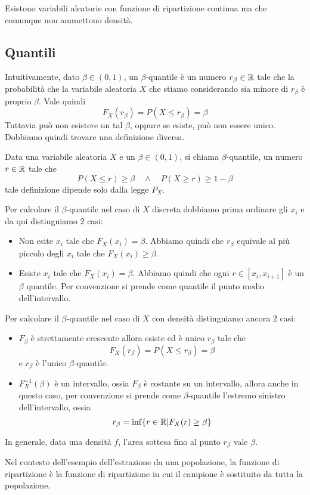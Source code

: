 \begin{observation}
	Esistono variabili aleatorie con funzione di ripartizione continua ma che comunque non
	ammettono densità.
\end{observation}

\subsection{Quantili}
Intuitivamente, dato $\beta \in (0,1)$, un $\beta$-quantile è un numero $r_\beta \in \mathbb{R}$ tale che
la probabilità che la variabile aleatoria $X$ che stiamo considerando sia minore di $r_\beta$ è
proprio $\beta$. Vale quindi
\[ F_X (r_\beta) = P(X \leq r_\beta) = \beta \]
Tuttavia può non esistere un tal $\beta$, oppure se esiste, può non essere unico. Dobbiamo quindi
trovare una definizione diversa.

\begin{definition}
	Data una variabile aleatoria $X$ e un $\beta \in (0,1)$, si chiama $\beta$-quantile, un numero
	$r \in \mathbb{R}$ tale che
	\[ P(X \leq r) \geq \beta \quad \land \quad P(X \geq r) \geq 1 - \beta \]
	tale definizione dipende solo dalla legge $P_X$.
\end{definition}

Per calcolare il $\beta$-quantile nel caso di $X$ discreta dobbiamo prima ordinare gli $x_i$ e da
qui distinguiamo 2 casi:
\begin{itemize}
	\item Non esite $x_i$ tale che $F_X(x_i) = \beta$. Abbiamo quindi che $r_\beta$ equivale al più
	      piccolo degli $x_i$ tale che $F_X(x_i) \geq \beta$.
	\item Esiste $x_i$ tale che $F_X(x_i) = \beta$. Abbiamo quindi che ogni $r \in [x_i, x_{i+1}]$
	      è un $\beta$ quantile. Per convenzione si prende come quantile il punto medio
	      dell'intervallo.
\end{itemize}
Per calcolare il $\beta$-quantile nel caso di $X$ con densità distinguiamo ancora 2 casi:
\begin{itemize}
	\item $F_\beta$ è strettamente crescente allora esiste ed è unico $r_\beta$ tale che
	      \[ F_X(r_\beta) = P(X \leq r_\beta) = \beta \]
	      e $r_\beta$ è l'unico $\beta$-quantile.
	\item $F_X^{-1} (\beta)$ è un intervallo, ossia $F_\beta$ è costante su un intervallo, allora
	      anche in questo caso, per convenzione si prende come $\beta$-quantile l'estremo sinistro
	      dell'intervallo, ossia
	      \[ r_\beta = \inf \{ r \in \mathbb{R} | F_X(r) \geq \beta \} \]
\end{itemize}
In generale, data una densità $f$, l'area sottesa fino al punto $r_\beta$ vale $\beta$.

\begin{observation}
	Nel contesto dell'esempio dell'estrazione da una popolazione, la funzione di ripartizione è la
	funzione di ripartizione in cui il campione è sostituito da tutta la popolazione.
\end{observation}